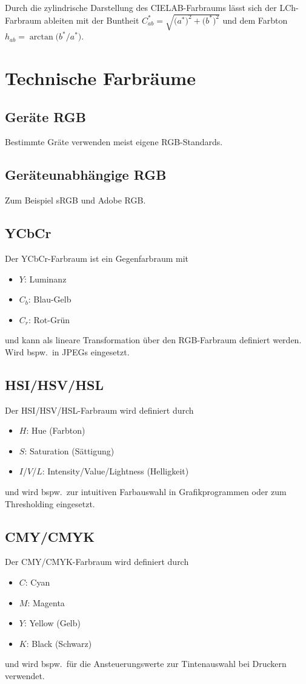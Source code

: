 \documentclass[a4paper, 11pt, accentcolor = tud3b]{tudreport}
\newcommand{\bspw}{bspw.~}
\begin{document}
			Durch die zylindrische Darstellung des CIELAB-Farbraums lässt sich der LCh-Farbraum ableiten mit der Buntheit \( C_{ab}^\ast = \sqrt{\big(a^\ast\big)^2 + \big(b^\ast\big)^2} \) und dem Farbton \( h_{ab} = \arctan\big( b^\ast / a^\ast \big) \).

		\section{Technische Farbräume}
			\subsection{Geräte RGB}
				Bestimmte Gräte verwenden meist eigene RGB-Standards.

			\subsection{Geräteunabhängige RGB}
				Zum Beispiel sRGB und Adobe RGB.

			\subsection{YCbCr}
				Der YCbCr-Farbraum ist ein Gegenfarbraum mit
				\begin{itemize}
					\item \(Y\): Luminanz
					\item \(C_b\): Blau-Gelb
					\item \(C_r\): Rot-Grün
				\end{itemize}
				und kann als lineare Transformation über den RGB-Farbraum definiert werden. Wird \bspw in JPEGs eingesetzt.

			\subsection{HSI/HSV/HSL}
				Der HSI/HSV/HSL-Farbraum wird definiert durch
				\begin{itemize}
					\item \(H\): Hue (Farbton)
					\item \(S\): Saturation (Sättigung)
					\item \(I\)/\(V\)/\(L\): Intensity/Value/Lightness (Helligkeit)
				\end{itemize}
				und wird \bspw zur intuitiven Farbauswahl in Grafikprogrammen oder zum Thresholding eingesetzt.

			\subsection{CMY/CMYK}
				Der CMY/CMYK-Farbraum wird definiert durch
				\begin{itemize}
					\item \(C\): Cyan
					\item \(M\): Magenta
					\item \(Y\): Yellow (Gelb)
					\item \(K\): Black (Schwarz)
				\end{itemize}
				und wird \bspw für die Ansteuerungswerte zur Tintenauswahl bei Druckern verwendet.
\end{document}

